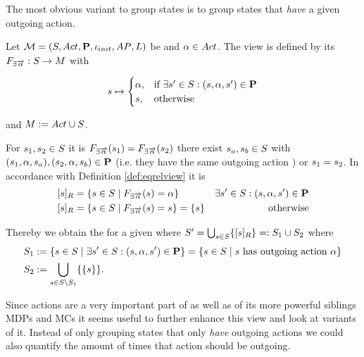 \documentclass[preview]{standalone}
\begin{document}
The most obvious variant to group states is to group states that \emph{have} a given outgoing action. 

\begin{definition}
	Let ${{{\mathcal{M}}}} = {{({S}, {Act}, {\textbf{P}}, {\iota_{init}}, {AP}, {L})}}$ be \chosengraphtypeN and ${\alpha} \in {Act}$. The view \viewhasoutaction is defined by its \grpfctN ${{F_{\exists{\overrightarrow{\ensuremath{{\alpha}}}}}}} : {S} \to {\ensuremath{{M}}}$ with 
	
	\[
	{s} \mapsto
	\begin{cases}
		{\alpha},				& \text{if } \exists {s}' \in {S}: ({s}, {\alpha}, {s}') \in {\ensuremath{{\textbf{P}}}} \\
		{{s}},          	& \text{otherwise}
	\end{cases}
	\]
	
	and ${{M}} := {{Act} \cup {S}}$.	
\end{definition}


For ${s}_1,{s}_2 \in {S}$ it is ${{F_{\exists{\overrightarrow{\ensuremath{{\alpha}}}}}}}({s}_1) = {{F_{\exists{\overrightarrow{\ensuremath{{\alpha}}}}}}}({s}_2)$ \iffN 
there exist ${s}_{a},{s}_{b} \in {S}$ with 
$({s}_1, {\alpha}, {s}_{a}), ({s}_2, {\alpha}, {s}_{b}) \in {\ensuremath{{\textbf{P}}}}$ (i.e. they have the same outgoing action \action) or ${s}_1 = {s}_2$. 
In accordance with Definition \ref{def:eqrelview} it is
\begin{align*}
	{\ensuremath{{[{s}]_{{R}}}}} &= \{{s} \in {S} \mid {\ensuremath{{F_{\exists{\overrightarrow{\ensuremath{{\alpha}}}}}}}}({s}) = {\alpha}\} &\exists{s}' \in {S} : ({s}, {\alpha}, {s}') \in {\ensuremath{{\textbf{P}}}} \\
	{{[{s}]_{{R}}}} &= \{{s} \in {S} \mid {\ensuremath{{F_{\exists{\overrightarrow{\ensuremath{{\alpha}}}}}}}}({s}) = {s}\} = \{s\} &\text{ otherwise}
\end{align*}

Thereby we obtain the \viewN \viewhasoutaction for a given \chosengraphtypeN \chgph where ${S}' = \bigcup_{{s} \in {S}} \{{{[{s}]_{{R}}}}\} =: {S}_1 \cup {S}_2$ where
\begin{align*}
	 {S}_1 &:= \{{s} \in {S} \mid \exists {s}' \in {S}: ({s}, {\alpha}, {s}') \in {\ensuremath{{\textbf{P}}}}\} = \{{s} \in {S} \mid {s} \text{ has outgoing action \ensuremath{{\alpha}}}\} \\
	{S}_2 &:= {\bigcup_{{s} \in {S} \setminus {S}_1}\{\{{s}\}\}}.
\end{align*}


Since actions are a very important part of \chosengraphtypesN as well as of its more powerful siblings MDPs and MCs it seems useful to further enhance this view and look at variants of it. Instead of only grouping states that only \emph{have} outgoing actions we could also quantify the amount of times that action should be outgoing.
\end{document}
